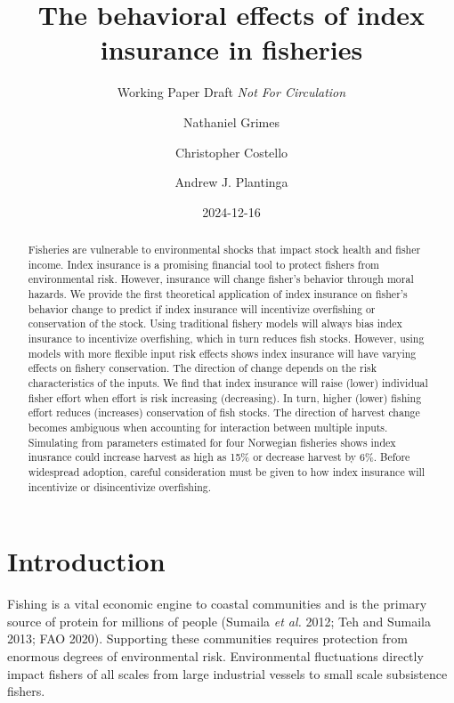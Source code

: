 \documentclass[
  letterpaper,
  DIV=11,
  numbers=noendperiod]{scrartcl}
\title{The behavioral effects of index insurance in fisheries}
\subtitle{Working Paper Draft \emph{Not For Circulation}}
\author{Nathaniel Grimes \and Christopher Costello \and Andrew J.
Plantinga}
\date{2024-12-16}
\renewcommand*\contentsname{Table of contents}
\newcommand\contentsname{Table of contents}
\theoremstyle{plain}
\theoremstyle{plain}
\theoremstyle{remark}
\begin{document}
\maketitle
\begin{abstract}
Fisheries are vulnerable to environmental shocks that impact stock
health and fisher income. Index insurance is a promising financial tool
to protect fishers from environmental risk. However, insurance will
change fisher's behavior through moral hazards. We provide the first
theoretical application of index insurance on fisher's behavior change
to predict if index insurance will incentivize overfishing or
conservation of the stock. Using traditional fishery models will always
bias index insurance to incentivize overfishing, which in turn reduces
fish stocks. However, using models with more flexible input risk effects
shows index insurance will have varying effects on fishery conservation.
The direction of change depends on the risk characteristics of the
inputs. We find that index insurance will raise (lower) individual
fisher effort when effort is risk increasing (decreasing). In turn,
higher (lower) fishing effort reduces (increases) conservation of fish
stocks. The direction of harvest change becomes ambiguous when
accounting for interaction between multiple inputs. Simulating from
parameters estimated for four Norwegian fisheries shows index inusrance
could increase harvest as high as 15\% or decrease harvest by 6\%.
Before widespread adoption, careful consideration must be given to how
index insurance will incentivize or disincentivize overfishing.
\end{abstract}
\ifdefined\Shaded\renewenvironment{Shaded}{\begin{tcolorbox}[interior hidden, sharp corners, enhanced, borderline west={3pt}{0pt}{shadecolor}, breakable, boxrule=0pt, frame hidden]}{\end{tcolorbox}}\fi

\renewcommand*\contentsname{Table of contents}
{
\hypersetup{linkcolor=}
\setcounter{tocdepth}{3}
\tableofcontents
}
\hypertarget{introduction}{%
\section{Introduction}\label{introduction}}

Fishing is a vital economic engine to coastal communities and is the
primary source of protein for millions of people (Sumaila \emph{et al.}
2012; Teh and Sumaila 2013; FAO 2020). Supporting these communities
requires protection from enormous degrees of environmental risk.
Environmental fluctuations directly impact fishers of all scales from
large industrial vessels to small scale subsistence fishers.
\end{document}
